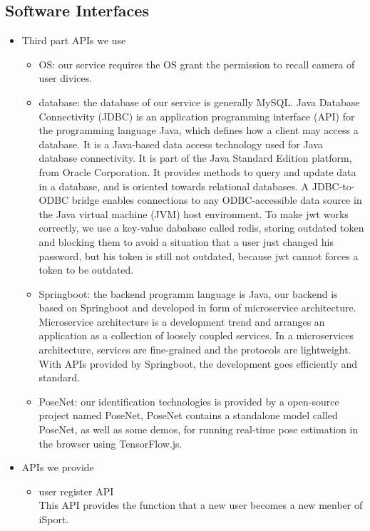 \documentclass[16pt]{scrreprt}
\begin{document}
\subsection{Software Interfaces}
\begin{itemize}
    \item Third part APIs we use
        \begin{itemize}
            \item OS: our service requires the OS grant the permission to recall camera of user divices.
            \item database: the database of our service is generally MySQL. Java Database Connectivity (JDBC) is an application programming interface (API) for the programming language Java, which defines how a client may access a database. It is a Java-based data access technology used for Java database connectivity. It is part of the Java Standard Edition platform, from Oracle Corporation. It provides methods to query and update data in a database, and is oriented towards relational databases. A JDBC-to-ODBC bridge enables connections to any ODBC-accessible data source in the Java virtual machine (JVM) host environment. To make jwt works correctly, we use a key-value dababase called redis, storing outdated token and blocking them to avoid a situation that a user just changed his password, but his token is still not outdated, because jwt cannot forces a token to be outdated.
            \item Springboot: the backend programm language is Java, our backend is based on Springboot and developed in form of microservice architecture. Microservice architecture is a development trend and arranges an application as a collection of loosely coupled services. In a microservices architecture, services are fine-grained and the protocols are lightweight. With APIs provided by Springboot, the development goes efficiently and standard.
            \item PoseNet: our identification technologies is provided by a open-source project named PoseNet, PoseNet contains a standalone model called PoseNet, as well as some demos, for running real-time pose estimation in the browser using TensorFlow.js.
        \end{itemize}
    \item APIs we provide
        \begin{itemize}
            \item user register API\\
                This API provides the function that a new user becomes a new menber of iSport.\\

\end{itemize}
\end{itemize}
\end{document}
